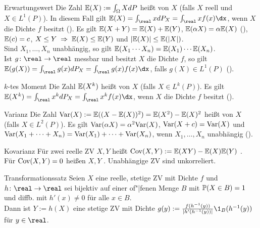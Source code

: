 \begin{Def}{Erwartungswert}
    Die Zahl $\mathbb{E}(X) := \int_\Omega X dP$ heißt  von $X$
    (falls $X$ reell und $X \in L^1(P)$).
    In diesem Fall gilt $\EE(X) = \int_\real x dP_X = \int_\real xf(x)\dx$,
    wenn $X$ die Dichte $f$ besitzt
    ().
    Es gilt $\mathbb{E}(X + Y) = \mathbb{E}(X) + \mathbb{E}(Y)$,
    $\mathbb{E}(\alpha X) = \alpha\mathbb{E}(X)$ (),
    $\mathbb{E}(c) = c$,
    $X \le Y \;\Rightarrow\; \mathbb{E}(X) \le \mathbb{E}(Y)$ und $|\mathbb{E}(X)| \le \mathbb{E}(|X|)$.\\
    Sind $X_1, \dotsc, X_n$ unabhängig, so gilt $\mathbb{E}(X_1 \dotsm X_n) = \mathbb{E}(X_1) \dotsm \mathbb{E}(X_n)$.\\
    Ist $g\colon \real \rightarrow \real$ messbar und besitzt $X$ die Dichte $f$, so gilt\\
    $\EE(g(X)) = \int_\real g(x) dP_X = \int_\real g(x)f(x)\dx$,
    falls $g(X) \in L^1(P)$
    ().
\end{Def}

\begin{Def}{$k$-tes Moment}
    Die Zahl $\mathbb{E}(X^k)$ heißt  von $X$
    (falls $X \in L^k(P)$).
    Es gilt $\EE(X^k) = \int_\real x^k dP_X = \int_\real x^k f(x)\dx$,
    wenn $X$ die Dichte $f$ besitzt
    ().
\end{Def}

\begin{Def}{Varianz}
    Die Zahl $\mathrm{Var}(X) := \mathbb{E}((X - \mathbb{E}(X))^2) = \mathbb{E}(X^2) - \mathbb{E}(X)^2$ heißt 
    von $X$ (falls $X \in L^2(P)$).
    Es gilt $\mathrm{Var}(\alpha X) = \alpha^2 \mathrm{Var}(X)$, $\mathrm{Var}(X + c) = \mathrm{Var}(X)$ und
    $\mathrm{Var}(X_1 + \dotsb + X_n) = \mathrm{Var}(X_1) + \dotsb + \mathrm{Var}(X_n)$,
    wenn $X_1, \dotsc, X_n$ unabhängig ().
\end{Def}

\begin{Def}{Kovarianz}
    Für zwei reelle ZV $X, Y$ heißt $\mathrm{Cov}(X, Y) := \mathbb{E}(XY) - \mathbb{E}(X)\mathbb{E}(Y)$
    .\\
    Für $\mathrm{Cov}(X, Y) = 0$ heißen $X, Y$ .
    Unabhängige ZV sind unkorreliert.
\end{Def}

\begin{Def}{Transformationssatz}
    Seien $X$ eine reelle, stetige ZV mit Dichte $f$
    und $h\colon \real \rightarrow \real$ sei bijektiv auf einer of"|fenen Menge $B$ mit
    $\mathbb{P}(X \in B) = 1$ und diffb. mit $h'(x) \not= 0$ für alle $x \in B$.\\
    Dann ist $Y := h(X)$ eine stetige ZV mit Dichte
    $g(y) := \frac{f(h^{-1}(y))}{|h'(h^{-1}(y))|} \1_B(h^{-1}(y))$
    für $y \in \real$.
\end{Def}

